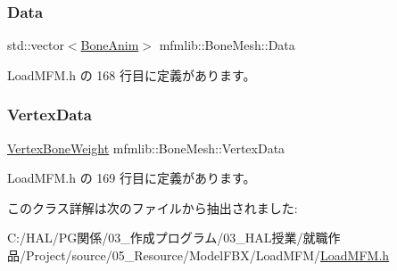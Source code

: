 \mbox{\label{classmfmlib_1_1_bone_mesh_a3ec6ff3ede0f20ad419500c80ce2e6c1}} 
\subsubsection{\texorpdfstring{Data}{Data}}
{\footnotesize\ttfamily std\+::vector$<$\mbox{\hyperlink{classmfmlib_1_1_bone_anim}{Bone\+Anim}}$>$ mfmlib\+::\+Bone\+Mesh\+::\+Data}



 Load\+M\+F\+M.\+h の 168 行目に定義があります。

\mbox{\label{classmfmlib_1_1_bone_mesh_ab252d2d15dc2e927471943a33b19fbc4}} 
\subsubsection{\texorpdfstring{Vertex\+Data}{VertexData}}
{\footnotesize\ttfamily \mbox{\hyperlink{classmfmlib_1_1_vertex_bone_weight}{Vertex\+Bone\+Weight}} mfmlib\+::\+Bone\+Mesh\+::\+Vertex\+Data}



 Load\+M\+F\+M.\+h の 169 行目に定義があります。



このクラス詳解は次のファイルから抽出されました\+:\begin{DoxyCompactItemize}
\item 
C\+:/\+H\+A\+L/\+P\+G関係/03\+\_\+作成プログラム/03\+\_\+\+H\+A\+L授業/就職作品/\+Project/source/05\+\_\+\+Resource/\+Model\+F\+B\+X/\+Load\+M\+F\+M/\mbox{\hyperlink{_load_m_f_m_8h}{Load\+M\+F\+M.\+h}}\end{DoxyCompactItemize}
